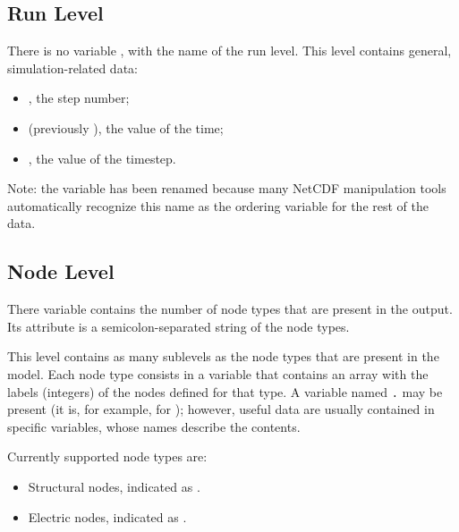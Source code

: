 \subsection{Run Level}
There is no variable , with the name of the run level.
This level contains general, simulation-related data:
\begin{itemize}
\item {}, the step number;
\item {} (previously ), the value of the time;
\item {}, the value of the timestep.
\end{itemize}
Note: the  variable has been renamed 
because many NetCDF manipulation tools automatically recognize
this name as the ordering variable for the rest of the data.



\subsection{Node Level}
There variable  contains the number of node types that are present in the output.
Its attribute  is a semicolon-separated string of the node types.

This level contains as many sublevels as the node types
that are present in the model.
Each node type consists in a variable that contains an array
with the labels (integers) of the nodes defined for that type.
A variable named \texttt{.} may be present
(it is, for example, for ); however, useful data are usually
contained in specific variables, whose names describe the contents.

Currently supported node types are:
\begin{itemize}
\item Structural nodes, indicated as .
\item Electric nodes, indicated as .
\end{itemize}



